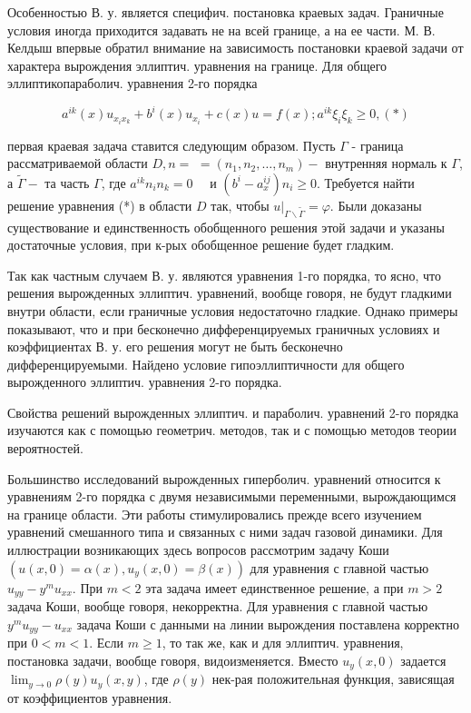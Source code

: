 \documentclass[10pt]{article}
\begin{document}
Особенностью В. у. является специфич. постановка краевых задач. Граничные условия иногда приходится задавать не на всей границе, а на ее части. М. В. Келдыш впервые обратил внимание на зависимость постановки краевой задачи от характера вырождения эллиптич. уравнения на границе. Для общего эллиптикопараболич. уравнения 2-го порядка



\[

a^{i k}(x) u_{x_{i} x_{k}}+b^{i}(x) u_{x_{i}}+c(x) u=f(x) ; a^{i k} \xi_{i} \xi_{k} \geqslant 0,(*)

\]



первая краевая задача ставится следующим образом. Пусть $\Gamma$ - граница рассматриваемой области $D, n=$ $=\left(n_{1}, n_{2}, \ldots, n_{m}\right)-$ внутренняя нормаль к $\Gamma$, а $\tilde{\Gamma}-$ та часть $\Gamma$, где $a^{i k} n_{i} n_{k}=0 \quad$ и $\left(b^{i}-a_{x}^{i j}\right) n_{i} \geqslant 0$. Требуется найти решение уравнения (*) в области $D$ так, чтобы $\left.u\right|_{\Gamma \backslash \tilde{\Gamma}}=\varphi$. Были доказаны существование и единственность обобщенного решения этой задачи и указаны достаточные условия, при к-рых обобщенное решение будет гладким.



Так как частным случаем В. у. являются уравнения 1-го порядка, то ясно, что решения вырожденных эллиптич. уравнений, вообще говоря, не будут гладкими внутри области, если граничные условия недостаточно гладкие. Однако примеры показывают, что и при бесконечно дифференцируемых граничных условиях и коэффициентах В. у. его решения могут не быть бесконечно дифференцируемыми. Найдено условие гипоэллиптичности для общего вырожденного эллиптич. уравнения 2-го порядка.



Свойства решений вырожденных эллиптич. и параболич. уравнений 2-го порядка изучаются как с помощью геометрич. методов, так и с помощью методов теории вероятностей.



Большинство исследований вырожденных гиперболич. уравнений относится к уравнениям 2-го порядка с двумя независимыми переменными, вырождающимся на границе области. Эти работы стимулировались прежде всего изучением уравнений смешанного типа и связанных с ними задач газовой динамики. Для иллюстрации возникающих здесь вопросов рассмотрим задачу Коши $\left(u(x, 0)=\alpha(x), u_{y}(x, 0)=\beta(x)\right)$ для уравнения с главной частью $u_{y y}-y^{m} u_{x x}$. При $m<2$ эта задача имеет единственное решение, а при $m>2$ задача Коши, вообще говоря, некорректна. Для уравнения с главной частью $y^{m} u_{y y}-u_{x x}$ задача Коши с данными на линии вырождения поставлена корректно при $0<m<1$. Если $m \geqslant 1$, то так же, как и для эллиптич. уравнения, постановка задачи, вообще говоря, видоизменяется. Вместо $u_{y}(x, 0)$ задается $\lim _{y \rightarrow 0} \rho(y) u_{y}(x, y)$, где $\rho(y)$ нек-рая положительная функция, зависящая от коэффициентов уравнения.
\end{document}
